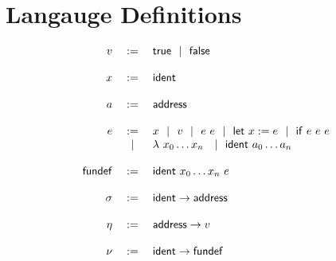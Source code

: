 \documentclass[9pt]{article}
\begin{document}
\section{Langauge Definitions}

\[
	\begin{array}{rcl}
	v &:=& \mathsf{true} ~~|~~ \mathsf{false}\\
	\\
	x &:=& \mathsf{ident}\\
	\\
	a &:=& \mathsf{address}\\
	\\
	e &:=& x ~~|~~ v ~~|~~ e~e ~~|~~ \mathsf{let}~x:=e ~~|~~ \mathsf{if}~e~e~e\\
	        &~~|~~& \lambda~x_0 \ldots x_n~~~|~~ \mathsf{ident}~a_0 \ldots a_n\\
	\\
	\mathsf{fundef} &:=& \mathsf{ident}~x_0 \ldots x_n~e\\
	\\
	\sigma &:=& \mathsf{ident} \rightarrow \mathsf{address}\\
	\\
	\eta &:=& \mathsf{address} \rightarrow v\\
	\\
	\nu &:=& \mathsf{ident} \rightarrow \mathsf{fundef}\\
	\\
	\end{array}
\]
\end{document}
